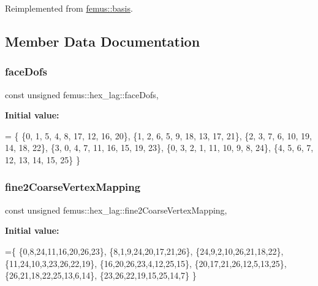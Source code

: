 Reimplemented from \mbox{\hyperlink{classfemus_1_1basis_abbb9deb1bd0b2d07a4b2995b07d58d2e}{femus\+::basis}}.



\subsection{Member Data Documentation}
\mbox{\label{classfemus_1_1hex__lag_a1f639d4d846dc3dee218811480317e03}} 
\subsubsection{\texorpdfstring{face\+Dofs}{faceDofs}}
{\footnotesize\ttfamily const unsigned femus\+::hex\+\_\+lag\+::face\+Dofs\hspace{0.3cm}{\ttfamily [static]}, {\ttfamily [protected]}}

{\bfseries Initial value\+:}
\begin{DoxyCode}
= \{ 
    \{0, 1, 5, 4, 8, 17, 12, 16, 20\},
    \{1, 2, 6, 5, 9, 18, 13, 17, 21\},
    \{2, 3, 7, 6, 10, 19, 14, 18, 22\},
    \{3, 0, 4, 7, 11, 16, 15, 19, 23\},
    \{0, 3, 2, 1, 11, 10, 9, 8, 24\},
    \{4, 5, 6, 7, 12, 13, 14, 15, 25\}
  \}
\end{DoxyCode}
\mbox{\label{classfemus_1_1hex__lag_a4bfe56640b5c0116ece86418e8a4e1be}} 
\subsubsection{\texorpdfstring{fine2\+Coarse\+Vertex\+Mapping}{fine2CoarseVertexMapping}}
{\footnotesize\ttfamily const unsigned femus\+::hex\+\_\+lag\+::fine2\+Coarse\+Vertex\+Mapping\hspace{0.3cm}{\ttfamily [static]}, {\ttfamily [protected]}}

{\bfseries Initial value\+:}
\begin{DoxyCode}
=\{
    \{0,8,24,11,16,20,26,23\},
    \{8,1,9,24,20,17,21,26\},
    \{24,9,2,10,26,21,18,22\},
    \{11,24,10,3,23,26,22,19\},
    \{16,20,26,23,4,12,25,15\},
    \{20,17,21,26,12,5,13,25\},
    \{26,21,18,22,25,13,6,14\},
    \{23,26,22,19,15,25,14,7\} \}
\end{DoxyCode}
\mbox{\label{classfemus_1_1hex__lag_aecbc5fe6a0428eeb352acb8db0c423e7}} 
